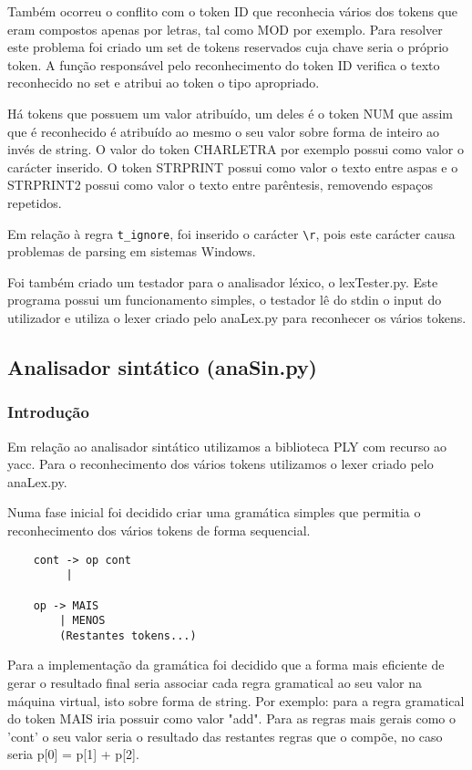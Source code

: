 \documentclass{article}
\begin{document}
Também ocorreu o conflito com o token ID que reconhecia vários dos tokens que eram compostos apenas por letras, tal como MOD por exemplo. Para resolver este problema foi criado um set de tokens reservados cuja chave seria o próprio token. A função responsável pelo reconhecimento do token ID verifica o texto reconhecido no set e atribui ao token o tipo apropriado.

Há tokens que possuem um valor atribuído, um deles é o token NUM que assim que é reconhecido é atribuído ao mesmo o seu valor sobre forma de inteiro ao invés de string. O valor do token CHARLETRA por exemplo possui como valor o carácter inserido. O token STRPRINT possui como valor o texto entre aspas e o STRPRINT2 possui como valor o texto entre parêntesis, removendo espaços repetidos.

Em relação à regra \texttt{t\_ignore}, foi inserido o carácter \verb|\r|, pois este carácter causa problemas de parsing em sistemas Windows.

Foi também criado um testador para o analisador léxico, o lexTester.py. Este programa possui um funcionamento simples, o testador lê do stdin o input do utilizador e utiliza o lexer criado pelo anaLex.py para reconhecer os vários tokens.






\subsection{Analisador sintático (anaSin.py)}
\subsubsection{Introdução}
Em relação ao analisador sintático utilizamos a biblioteca PLY com recurso ao yacc. Para o reconhecimento dos vários tokens utilizamos o lexer criado pelo anaLex.py.

Numa fase inicial foi decidido criar uma gramática simples que permitia o reconhecimento dos vários tokens de forma sequencial.
\begin{verbatim}
    cont -> op cont
         | 

    op -> MAIS
        | MENOS
        (Restantes tokens...)
\end{verbatim}

Para a implementação da gramática foi decidido que a forma mais eficiente de gerar o resultado final seria associar cada regra gramatical ao seu valor na máquina virtual, isto sobre forma de string. Por exemplo: para a regra gramatical do token MAIS iria possuir como valor "add". Para as regras mais gerais como o 'cont' o seu valor seria o resultado das restantes regras que o compõe, no caso seria p[0] = p[1] + p[2].
\end{document}
